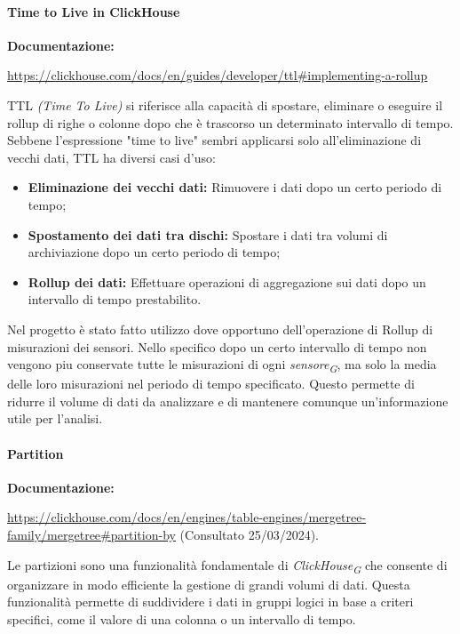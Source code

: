 \paragraph{Time to Live in ClickHouse} \label{sec:RollupTTL}
\textbf{Documentazione:}

\url{https://clickhouse.com/docs/en/guides/developer/ttl#implementing-a-rollup}\newline

TTL \textit{(Time To Live)} si riferisce alla capacità di spostare, eliminare o eseguire il rollup di righe o colonne dopo che è trascorso un determinato intervallo di tempo. Sebbene l'espressione "time to live" sembri applicarsi solo all'eliminazione di vecchi dati, TTL ha diversi casi d'uso:

\begin{itemize}
	\item \textbf{Eliminazione dei vecchi dati:} Rimuovere i dati dopo un certo periodo di tempo;
	\item \textbf{Spostamento dei dati tra dischi:} Spostare i dati tra volumi di archiviazione dopo un certo periodo di tempo;
	\item \textbf{Rollup dei dati:} Effettuare operazioni di aggregazione sui dati dopo un intervallo di tempo prestabilito.
\end{itemize}

Nel progetto è stato fatto utilizzo dove opportuno dell'operazione di Rollup di misurazioni dei sensori.
Nello specifico dopo un certo intervallo di tempo non vengono piu conservate tutte le misurazioni di ogni \textit{sensore}\textsubscript{\textit{G}}, ma solo la media delle loro misurazioni nel periodo di tempo specificato. Questo permette di ridurre il volume di dati da analizzare e di mantenere comunque un'informazione utile per l'analisi.

\paragraph{Partition}\label{sec:Partition}
\textbf{Documentazione:}

\url{https://clickhouse.com/docs/en/engines/table-engines/mergetree-family/mergetree#partition-by} (Consultato 25/03/2024).

Le partizioni sono una funzionalità fondamentale di \textit{ClickHouse}\textsubscript{\textit{G}} che consente di organizzare in modo efficiente la gestione di grandi volumi di dati. Questa funzionalità permette di suddividere i dati in gruppi logici in base a criteri specifici, come il valore di una colonna o un intervallo di tempo.

